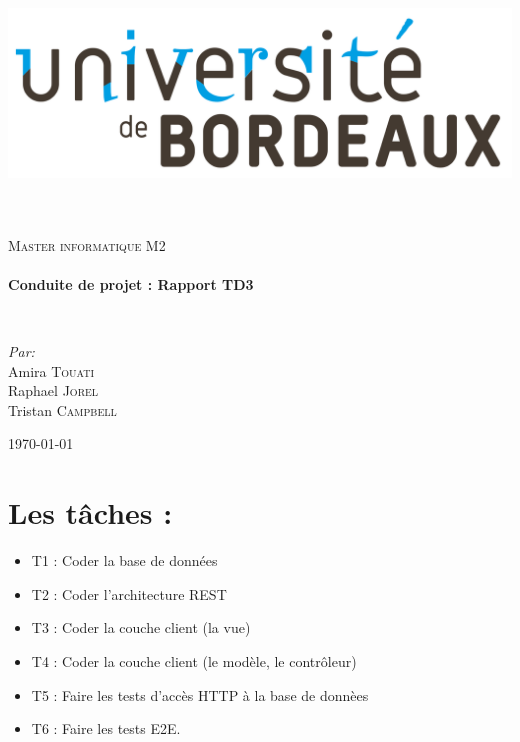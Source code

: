 \documentclass[a4paper,10pt]{report}
\begin{document}
\begin{titlepage}
\begin{center}
	
	~~~~~~~\includegraphics[scale=0.7]{university.png}~~~~~~~~~

		\HRule \\[2cm]
		\textsc{Master informatique M2}\\
		\HRule \\[2cm]
		
		{ \huge \bfseries Conduite de projet : Rapport TD3 \\[0.4cm] }
		
		\HRule \\[2cm]
		
		\noindent
		\begin{minipage}{0.5\textwidth}
		\begin{flushleft} \large
		\emph{Par:}\\
		\smallbreak
		Amira \textsc{Touati}\\
		Raphael \textsc{Jorel}\\
		Tristan \textsc{ Campbell}
		\end{flushleft}
		\end{minipage}%

	
		\vfill
		{\large \today}
		\end{center}
		
	\end{titlepage}
	\newpage
\section*{Les tâches :}
	\begin{itemize}
        \item T1 : Coder la base de données 
        \item T2 : Coder l'architecture REST
        \item T3 : Coder la couche client (la vue)
        \item T4 : Coder la couche client (le modèle, le contrôleur)
        \item T5 : Faire les tests d'accès HTTP à la base de donnèes
        \item T6 : Faire les tests E2E.
    \end{itemize}
\end{document}

